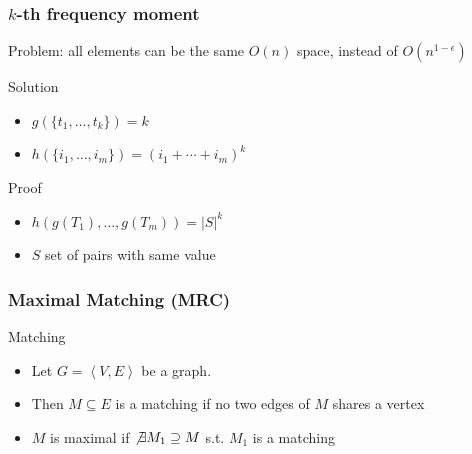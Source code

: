 \documentclass[12pt,aspectratio=169]{beamer}
\begin{document}
\begin{frame}\frametitle{$k$-th frequency moment}
  \begin{block}{Problem: all elements can be the same}
      $O(n)$ space, instead of $O(n^{1-\epsilon})$
    \end{block}

  \begin{block}{Solution}
    \begin{itemize}
    \item
      $g(\{t_{1}, \ldots , t_{k} \}) = k$
    \item
      $h(\{i_{1}, \ldots , i_{m} \}) = (i_{1} + \cdots + i_{m} )^{k}$
    \end{itemize}
  \end{block}

  \begin{block}{Proof}
    \begin{itemize}
    \item
      $h(g(T_{1}), \ldots , g(T_{m})) = |S|^{k}$
    \item
      $S$ set of pairs with same value
    \end{itemize}
  \end{block}
\end{frame}





\begin{frame}\frametitle{Maximal Matching (MRC)}
  \begin{block}{Matching}
    \begin{itemize}
    \item
      Let $G=\left\langle V,E \right\rangle $ be a graph.
    \item
      Then $M\subseteq E$ is a matching if no two edges of $M$ shares a vertex
    \item
      $M$ is maximal if $\not\exists M_{1}\supseteq M$ s.t. $M_{1}$ is a matching
    \end{itemize}
  \end{block}
\end{frame}
\end{document}
